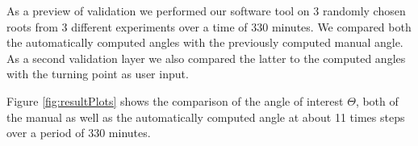 As a preview of validation we performed our software tool on 3 randomly chosen roots from 3 different experiments over a time of 330 minutes. We compared both the automatically computed angles with the previously computed manual angle. As a second validation layer we also compared the latter to the computed angles with the turning point as user input.

Figure \ref{fig:resultPlots} shows the comparison of the angle of interest \( \Theta \), both of the manual as well as the automatically computed angle at about 11 times steps over a period of 330 minutes.




